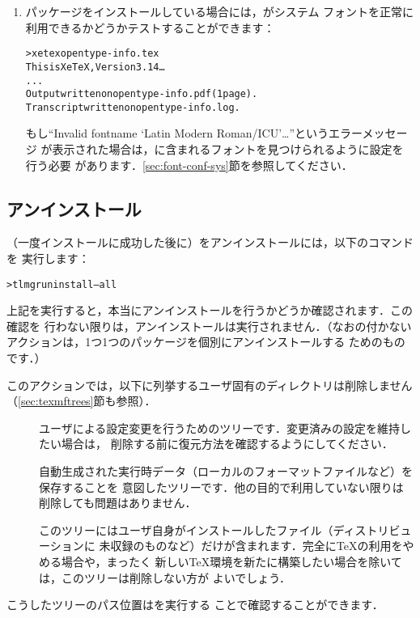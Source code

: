 \documentclass[uplatex,dvipdfmx,tombow]{jsarticle}
\begin{document}
\begin{enumerate}
\item {}パッケージをインストールしている場合には，\XeTeX がシステム
フォントを正常に利用できるかどうかテストすることができます：
%
\begin{alltt}
> xetex opentype-info.tex
This is XeTeX, Version 3.14\dots
...
Output written on opentype-info.pdf (1 page).
Transcript written on opentype-info.log.
\end{alltt}
%
もし``Invalid fontname `Latin Modern Roman/ICU'\dots''というエラーメッセージ
が表示された場合は，\TL に含まれるフォントを見つけられるように設定を行う必要
があります．\ref{sec:font-conf-sys}節を参照してください．
\end{enumerate}

\subsection{アンインストール}
\label{sec:uninstall}

（一度インストールに成功した後に）\TL をアンインストールには，以下のコマンドを
実行します：
%
\begin{alltt}
> tlmgr uninstall --all
\end{alltt}
%
上記を実行すると，本当にアンインストールを行うかどうか確認されます．この確認を
行わない限りは，アンインストールは実行されません．（なおの付かない
アクションは，1つ1つのパッケージを個別にアンインストールする
ためのものです．）

このアクションでは，以下に列挙するユーザ固有のディレクトリは削除しません
（\ref{sec:texmftrees}節も参照）．
%
\begin{description}
\item[]
ユーザによる設定変更を行うためのツリーです．変更済みの設定を維持したい場合は，
削除する前に復元方法を確認するようにしてください．

\item[]
自動生成された実行時データ（ローカルのフォーマットファイルなど）を保存することを
意図したツリーです．他の目的で利用していない限りは削除しても問題はありません．

\item[]
このツリーにはユーザ自身がインストールしたファイル（ディストリビューションに
未収録のものなど）だけが含まれます．完全に\TeX の利用をやめる場合や，まったく
新しい\TeX 環境を新たに構築したい場合を除いては，このツリーは削除しない方が
よいでしょう．
\end{description}
%
こうしたツリーのパス位置はを実行する
ことで確認することができます．
\end{document}
